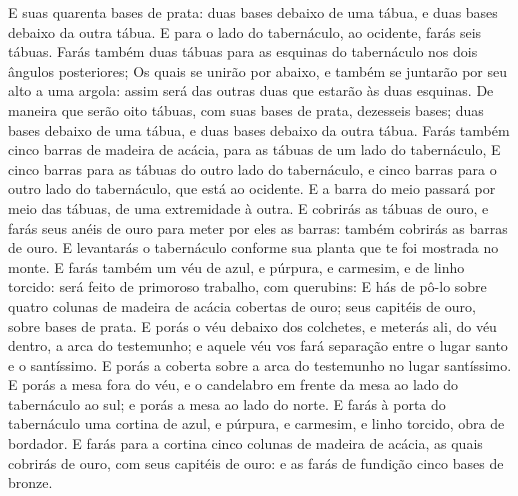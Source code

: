 {E suas quarenta bases de prata: duas bases debaixo de uma tábua, e duas bases debaixo da outra tábua.
E para o lado do tabernáculo, ao ocidente, farás seis tábuas.
Farás também duas tábuas para as esquinas do tabernáculo nos dois ângulos posteriores;
Os quais se unirão por abaixo, e também se juntarão por seu alto a uma argola: assim será das outras duas que estarão às duas esquinas.
De maneira que serão oito tábuas, com suas bases de prata, dezesseis bases; duas bases debaixo de uma tábua, e duas bases debaixo da outra tábua.
Farás também cinco barras de madeira de acácia, para as tábuas de um lado do tabernáculo,
E cinco barras para as tábuas do outro lado do tabernáculo, e cinco barras para o outro lado do tabernáculo, que está ao ocidente.
E a barra do meio passará por meio das tábuas, de uma extremidade à outra.
E cobrirás as tábuas de ouro, e farás seus anéis de ouro para meter por eles as barras: também cobrirás as barras de ouro.
E levantarás o tabernáculo conforme sua planta que te foi mostrada no monte.
E farás também um véu de azul, e púrpura, e carmesim, e de linho torcido: será feito de primoroso trabalho, com querubins:
E hás de pô-lo sobre quatro colunas de madeira de acácia cobertas de ouro; seus capitéis de ouro, sobre bases de prata.
E porás o véu debaixo dos colchetes, e meterás ali, do véu dentro, a arca do testemunho; e aquele véu vos fará separação entre o lugar santo e o santíssimo.
E porás a coberta sobre a arca do testemunho no lugar santíssimo.
E porás a mesa fora do véu, e o candelabro em frente da mesa ao lado do tabernáculo ao sul; e porás a mesa ao lado do norte.
E farás à porta do tabernáculo uma cortina de azul, e púrpura, e carmesim, e linho torcido, obra de bordador.
E farás para a cortina cinco colunas de madeira de acácia, as quais cobrirás de ouro, com seus capitéis de ouro: e as farás de fundição cinco bases de bronze.

}
